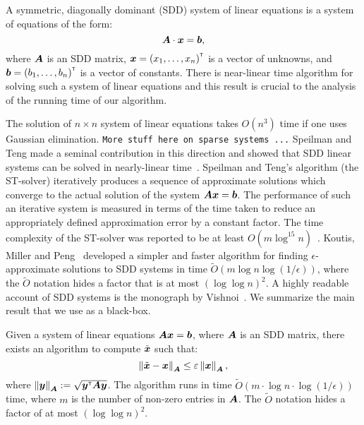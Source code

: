 A symmetric, diagonally dominant (SDD) system of linear equations is a system of 
equations of the form:
\[
	\boldsymbol{A} \cdot \boldsymbol{x} = \boldsymbol{b},
\]
where $\boldsymbol{A}$ is an SDD matrix, $\boldsymbol{x} = {(x_1, \ldots, x_n)}^{\scriptscriptstyle \mathsf{T}}$ 
is a vector of unknowns, and $\boldsymbol{b} = {(b_1, \ldots, b_n)}^{\scriptscriptstyle \mathsf{T}}$ is a vector of constants. 
There is near-linear time algorithm for solving such a system of linear equations 
and this result is crucial to the analysis of the running time of our algorithm. 

The solution of $n \times n$ system of linear equations takes $O(n^3)$ time 
if one uses Gaussian elimination. \texttt{More stuff here on sparse systems ...}
Speilman and Teng made a seminal contribution in this direction and 
showed that SDD linear systems can be solved in nearly-linear 
time~\cite{ST04,EEST05,ST08}. Speilman and Teng's algorithm (the ST-solver)
iteratively produces a sequence of approximate solutions which converge to the 
actual solution of the system $\boldsymbol{A} \boldsymbol{x} = \boldsymbol{b}$. The performance 
of such an iterative system is measured in terms of the time taken to reduce 
an appropriately defined approximation error by a constant factor. The time 
complexity of the ST-solver was reported to be at least $O(m \log^{15} n)$~\cite{KMP11}.  
Koutis, Miller and Peng~\cite{KMP10,KMP11} developed a simpler and faster algorithm 
for finding $\epsilon$-approximate solutions to SDD systems in time 
$\tilde{O}(m \log n \log (1/\epsilon) )$, where the $\tilde{O}$ notation hides 
a factor that is at most $(\log \log n)^2$. A highly readable account 
of SDD systems is the monograph by Vishnoi~\cite{Vis13}. We summarize the 
main result that we use as a black-box.  
\begin{proposition} \label{prop:SDD_systems} {\textrm{\cite{KMP11,Vis13}}}
	Given a system of linear equations $\boldsymbol{A} \boldsymbol{x} = \boldsymbol{b}$, where $\boldsymbol{A}$
	is an SDD matrix, there exists an algorithm to compute $\tilde{\boldsymbol{x}}$  
	such that:
		\[
			\left \| \tilde{\boldsymbol{x}} - \boldsymbol{x} \right \|_{\boldsymbol{A}} \leq \varepsilon \left \| \boldsymbol{x} \right \|_{\boldsymbol{A}}, 
		\]
	where $\left \| \boldsymbol{y} \right \|_{\boldsymbol{A}} := \sqrt{{\boldsymbol{y}}^{\scriptscriptstyle \mathsf{T}} \boldsymbol{A} \boldsymbol{y}}$. The algorithm runs in 
	time $\tilde{O}(m \cdot \log n \cdot \log (1 / \epsilon) )$ time, where $m$ is the number of non-zero 
	entries in $\boldsymbol{A}$. The $\tilde{O}$ notation hides a factor of at most $(\log \log n)^2$.
\end{proposition} 

